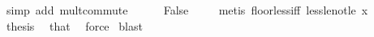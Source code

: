 \begin{isabellebody}
\ {\isacharparenleft}{\kern0pt}simp\ add{\isacharcolon}{\kern0pt}\ mult{\isachardot}{\kern0pt}commute{\isacharparenright}{\kern0pt}\isanewline
\ \ \ \ \isamarkupfalse%
\ False\ \isamarkupfalse%
\ {\isacharasterisk}{\kern0pt}{\isacharasterisk}{\kern0pt}\ \isamarkupfalse%
\ {\isacharparenleft}{\kern0pt}metis\ floor{\isacharunderscore}{\kern0pt}less{\isacharunderscore}{\kern0pt}iff\ less{\isacharunderscore}{\kern0pt}le{\isacharunderscore}{\kern0pt}not{\isacharunderscore}{\kern0pt}le\ x{\isacharparenleft}{\kern0pt}{}{\isacharparenright}{\kern0pt}{\isacharparenright}{\kern0pt}\isanewline
\ \ \isacommand{{\isacharbraceright}{\kern0pt}}\isamarkupfalse%
\isanewline
\ \ \isamarkupfalse%
\ \isamarkupfalse%
\ {\isacharquery}{\kern0pt}thesis\ \isamarkupfalse%
\ that\ \isamarkupfalse%
\ force\isanewline
{}\isamarkupfalse%
\ blast%
\endisatagproof
{\isafoldproof}%
%
\isadelimproof
\isanewline
%
\endisadelimproof
%
\isadelimtheory
\isanewline
%
\endisadelimtheory
%
\isatagtheory
{}\isamarkupfalse%
%
\endisatagtheory
{\isafoldtheory}%
%
\isadelimtheory
%
\endisadelimtheory
%
\end{isabellebody}%
\endinput
